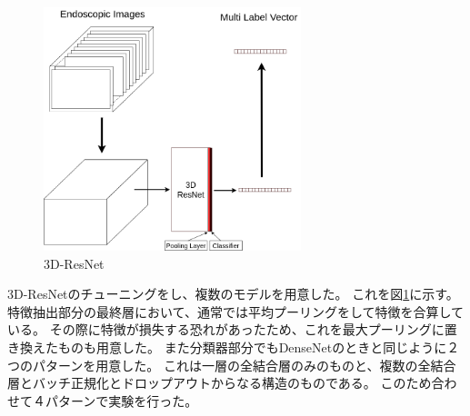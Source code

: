 \begin{figure}[tb]
    \begin{center}
        \includegraphics[width=75mm]{./fig/ieice3.png}
        \caption{3D-ResNet}
        \label{fig:3d_resnet}
    \end{center}
\end{figure}

3D-ResNetのチューニングをし、複数のモデルを用意した。
これを図\ref{fig:3d_resnet}に示す。
特徴抽出部分の最終層において、通常では平均プーリングをして特徴を合算している。
その際に特徴が損失する恐れがあったため、これを最大プーリングに置き換えたものも用意した。
また分類器部分でもDenseNetのときと同じように２つのパターンを用意した。
これは一層の全結合層のみのものと、複数の全結合層とバッチ正規化とドロップアウトからなる構造のものである。
このため合わせて４パターンで実験を行った。
